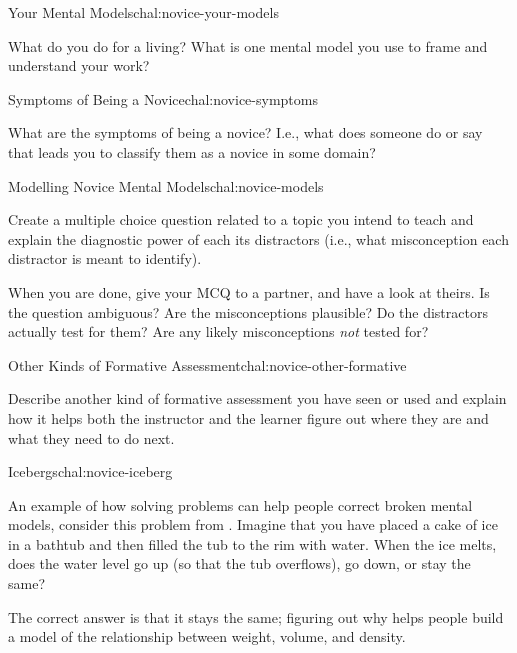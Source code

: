 
\begin{challenge}{Your Mental Models}{chal:novice-your-models}

What do you do for a living? What is one mental model you use to frame
and understand your work?

\end{challenge}

\begin{challenge}{Symptoms of Being a Novice}{chal:novice-symptoms}

What are the symptoms of being a novice?  I.e., what does someone do
or say that leads you to classify them as a novice in some domain?

\end{challenge}

\begin{challenge}{Modelling Novice Mental Models}{chal:novice-models}

Create a multiple choice question related to a topic you intend to teach
and explain the diagnostic power of each its distractors (i.e., what
misconception each distractor is meant to identify).

When you are done, give your MCQ to a partner, and have a look at
theirs.  Is the question ambiguous?  Are the misconceptions plausible?
Do the distractors actually test for them?  Are any likely
misconceptions \emph{not} tested for?

\end{challenge}

\begin{challenge}{Other Kinds of Formative Assessment}{chal:novice-other-formative}

Describe another kind of formative assessment you have seen or used and
explain how it helps both the instructor and the learner figure out
where they are and what they need to do next.

\end{challenge}

\begin{challenge}{Icebergs}{chal:novice-iceberg}

An example of how solving problems can help people correct broken
mental models, consider this problem from \cite{epstein}. Imagine that
you have placed a cake of ice in a bathtub and then filled the tub to
the rim with water. When the ice melts, does the water level go up (so
that the tub overflows), go down, or stay the same?


The correct answer is that it stays the same; figuring out why helps
people build a model of the relationship between weight, volume, and
density.

\end{challenge}
